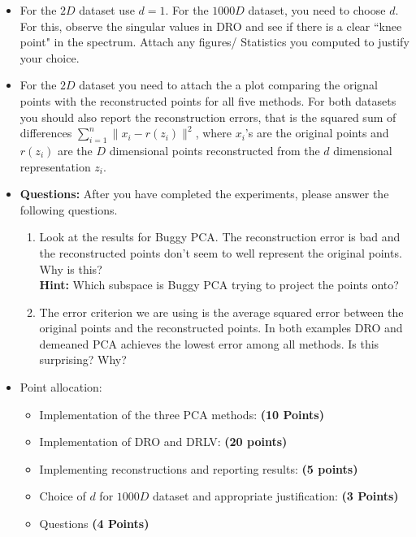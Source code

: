 \begin{itemize}
\item
For the $2D$ dataset use $d=1$. For the $1000D$ dataset, you need to choose
$d$. For this, observe the singular values in DRO and see if there is a clear
``knee point" in the spectrum.
Attach any figures/ Statistics you computed to justify your choice.

\item
For the $2D$ dataset you need to attach the a 
plot comparing the orignal points with the reconstructed points for all five
methods.
For both datasets you should also report the reconstruction errors, that is the squared sum of
differences $\sum_{i=1}^n \|x_i - r(z_i)\|^2$,
where $x_i$'s are the original points and $r(z_i)$ are the $D$ dimensional points
reconstructed from the 
$d$ dimensional representation $z_i$.

\item \textbf{Questions:} After you have completed the experiments, please answer the following questions.
\begin{enumerate}
\item Look at the results for Buggy PCA. The reconstruction error is bad and the
reconstructed points don't seem to well represent the original points. Why is
this? \\
\textbf{Hint: } Which subspace is Buggy PCA trying to project the points
onto?
\item The error criterion we are using is the average squared error 
between the original points and the reconstructed points.
In both examples DRO and demeaned PCA achieves the lowest error among all
methods. 
Is this surprising? Why?
\end{enumerate}

\item Point allocation:
\begin{itemize}
\item Implementation of the three PCA methods: \textbf{(10 Points)}
\item Implementation of DRO and DRLV: \textbf{(20 points)}
\item Implementing reconstructions and reporting results: \textbf{(5 points)}
\item Choice of $d$ for $1000D$ dataset and appropriate justification:
\textbf{(3 Points)}
\item Questions \textbf{(4 Points)}
\end{itemize}

\end{itemize}



